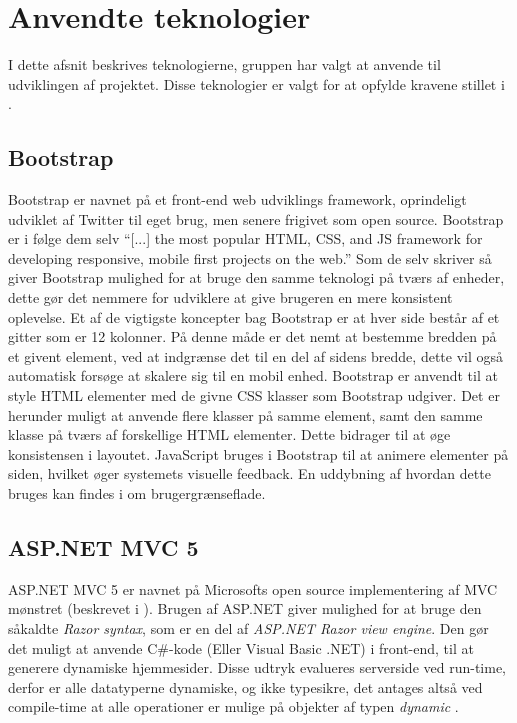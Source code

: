 \section{Anvendte teknologier}
I dette afsnit beskrives teknologierne, gruppen har valgt at anvende til udviklingen af projektet.
Disse teknologier er valgt for at opfylde kravene stillet i .

\subsection{Bootstrap}
Bootstrap er navnet på et front-end web udviklings framework, oprindeligt udviklet af Twitter til eget brug, men senere frigivet som open source.
Bootstrap er i følge dem selv ``[...] the most popular HTML, CSS, and JS framework for developing responsive, mobile first projects on the web.'' \cite{GETBOOTSTRAP}
Som de selv skriver så giver Bootstrap mulighed for at bruge den samme teknologi på tværs af enheder, dette gør det nemmere for udviklere at give brugeren en mere konsistent oplevelse.
Et af de vigtigste koncepter bag Bootstrap er at hver side består af et gitter som er 12 kolonner.
På denne måde er det nemt at bestemme bredden på et givent element, ved at indgrænse det til en del af sidens bredde, dette vil også automatisk forsøge at skalere sig til en mobil enhed.
Bootstrap er anvendt til at style HTML elementer med de givne CSS klasser som Bootstrap udgiver.
Det er herunder muligt at anvende flere klasser på samme element, samt den samme klasse på tværs af forskellige HTML elementer.
Dette bidrager til at øge konsistensen i layoutet.
JavaScript bruges i Bootstrap til at animere elementer på siden, hvilket øger systemets visuelle feedback.
En uddybning af hvordan dette bruges kan findes i  om brugergrænseflade. \cite{GETBOOTSTRAP}

\subsection{ASP.NET MVC 5}\label{aspnet}
ASP.NET MVC 5 er navnet på Microsofts open source implementering af MVC mønstret (beskrevet i ).
Brugen af ASP.NET giver mulighed for at bruge den såkaldte \textit{Razor syntax}, som er en del af \textit{ASP.NET Razor view engine}.
Den gør det muligt at anvende C\#-kode (Eller Visual Basic .NET) i front-end, til at generere dynamiske hjemmesider.
Disse udtryk evalueres serverside ved run-time, derfor er alle datatyperne dynamiske, og ikke typesikre, det antages altså ved compile-time at alle operationer er mulige på objekter af typen \textit{dynamic} \citep{UsingTypeDynamic}.

